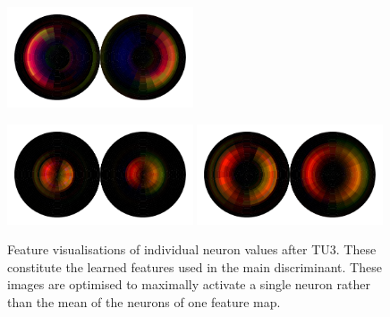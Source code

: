 \begin{figure}[h!]
\begin{center}
        \includegraphics[width=0.49\textwidth]{figures/appendix_featurevis/TU3_4_1_1.pdf}
    \end{center}
    \begin{center}
        \includegraphics[width=0.49\textwidth]{figures/appendix_featurevis/TU3_6_1_0.pdf}
        \includegraphics[width=0.49\textwidth]{figures/appendix_featurevis/TU3_6_1_1.pdf}
    \end{center}
    \caption{Feature visualisations of individual neuron values after TU3. These constitute the learned features used in the main discriminant.
             These images are optimised to maximally activate a single neuron rather than the mean of the neurons of one feature map.}
\end{figure}


